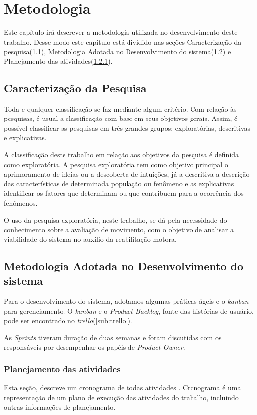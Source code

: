 
\chapter[Metodologia]{Metodologia}
  Este capítulo irá descrever a metodologia utilizada no desenvolvimento deste trabalho.
Desse modo este capítulo está dividido nas seções Caracterização da pesquisa(\ref{sec:caracPesquisa}),
Metodologia Adotada no Desenvolvimento do sistema(\ref{sec:metDesenv}) e Planejamento das atividades(\ref{Sec:Planejamento}).

\section{Caracterização da Pesquisa}\label{sec:caracPesquisa}

Toda e qualquer classificação se faz mediante algum critério. Com relação às
pesquisas, é usual a classificação com base em seus objetivos gerais. Assim, é
possível classificar as pesquisas em três grandes grupos: exploratórias, descritivas e
explicativas\cite{gil}.

A classificação deste trabalho em relação aos objetivos da pesquisa é definida como
exploratória. A pesquisa exploratória tem como objetivo principal o aprimoramento de
ideias ou a descoberta de intuições, já a descritiva a descrição das características de
determinada população ou fenômeno e as explicativas identificar os fatores que
determinam ou que contribuem para a ocorrência dos fenômenos\cite{gil}.

O uso da pesquisa exploratória, neste trabalho, se dá pela necessidade do conhecimento
 sobre a avaliação de movimento, com o objetivo de
analisar a viabilidade do sistema no auxílio da reabilitação motora.


\section{Metodologia Adotada no Desenvolvimento do sistema}\label{sec:metDesenv}
  Para o desenvolvimento do sistema, adotamos algumas práticas ágeis e o \textit{kanban}\cite{kanban}
 para gerenciamento. O \textit{kanban} e o \textit{Product Backlog}, fonte das histórias de usuário,
   pode ser encontrado no \textit{trello}(\ref{sub:trello}).

  As \textit{Sprints} tiveram duração de duas semanas e foram
discutidas com os responsáveis por desempenhar os papéis de \textit{Product Owner}.


\subsection{Planejamento das atividades}
\label{Sec:Planejamento}
  Esta seção, descreve um cronograma de todas atividades
. Cronograma  é uma representação de um plano de
execução das atividades do trabalho, incluindo  outras
informações de planejamento.

